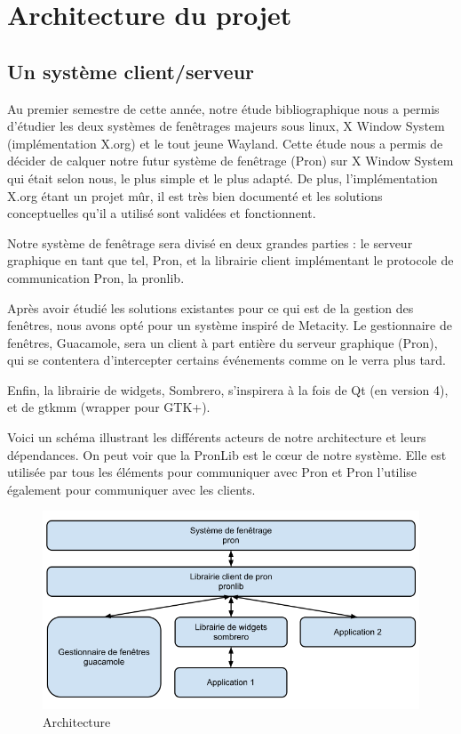 \section{Architecture du projet}

\subsection{Un système client/serveur}

Au premier semestre de cette année, notre étude bibliographique nous a permis d'étudier les deux systèmes de fenêtrages majeurs sous linux, X Window System (implémentation X.org) et le tout jeune Wayland.
Cette étude nous a permis de décider de calquer notre futur système de fenêtrage (Pron) sur X Window System qui était selon nous, le plus simple et le plus adapté.
De plus, l'implémentation X.org étant un projet mûr, il est très bien documenté et les solutions conceptuelles qu'il a utilisé sont validées et fonctionnent.

Notre système de fenêtrage sera divisé en deux grandes parties : le serveur graphique en tant que tel, Pron, et la librairie client implémentant le protocole de communication Pron, la pronlib.

Après avoir étudié les solutions existantes pour ce qui est de la gestion des fenêtres, nous avons opté pour un système inspiré de Metacity.
Le gestionnaire de fenêtres, Guacamole, sera un client à part entière du serveur graphique (Pron), qui se contentera d'intercepter certains événements comme on le verra plus tard.

Enfin, la librairie de widgets, Sombrero, s'inspirera à la fois de Qt (en version 4), et de gtkmm (wrapper pour GTK+).

Voici un schéma illustrant les différents acteurs de notre architecture et leurs dépendances.
On peut voir que la PronLib est le cœur de notre système.
Elle est utilisée par tous les éléments pour communiquer avec Pron et Pron l'utilise également pour communiquer avec les clients.
  
\begin{figure}[H]
  \centering
  \includegraphics[width=14cm]{images/architecture.png}
  \caption{Architecture}
  \label{fig:architecture}
\end{figure}

